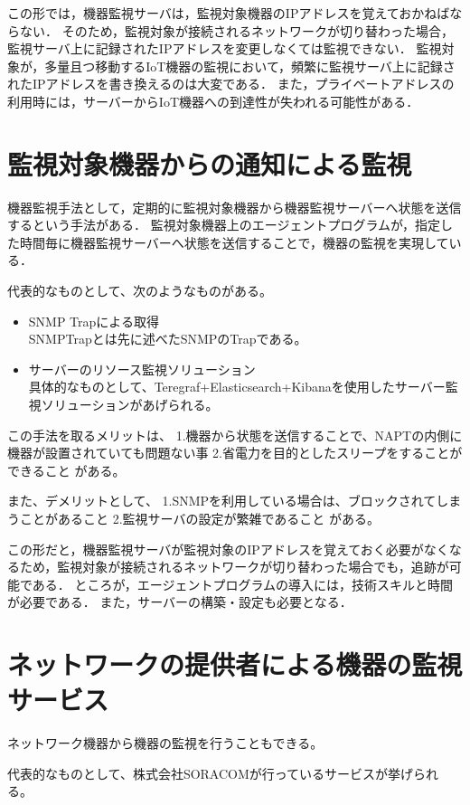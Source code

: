 	この形では，機器監視サーバは，監視対象機器のIPアドレスを覚えておかねばならない．
	そのため，監視対象が接続されるネットワークが切り替わった場合，監視サーバ上に記録されたIPアドレスを変更しなくては監視できない．
	監視対象が，多量且つ移動するIoT機器の監視において，頻繁に監視サーバ上に記録されたIPアドレスを書き換えるのは大変である．
	また，プライベートアドレスの利用時には，サーバーからIoT機器への到達性が失われる可能性がある．

\section{監視対象機器からの通知による監視}
	機器監視手法として，定期的に監視対象機器から機器監視サーバーへ状態を送信するという手法がある．
	監視対象機器上のエージェントプログラムが，指定した時間毎に機器監視サーバーへ状態を送信することで，機器の監視を実現している．
	\medskip
	
	代表的なものとして、次のようなものがある。
	\begin{itemize}
		\item SNMP Trapによる取得\\
			SNMPTrapとは先に述べたSNMPのTrapである。
		\item サーバーのリソース監視ソリューション\\
			具体的なものとして、Teregraf+Elasticsearch+Kibanaを使用したサーバー監視ソリューションがあげられる。
	\end{itemize}
	
	この手法を取るメリットは、
	1.機器から状態を送信することで、NAPTの内側に機器が設置されていても問題ない事
	2.省電力を目的としたスリープをすることができること
	がある。

	また、デメリットとして、
	1.SNMPを利用している場合は、ブロックされてしまうことがあること
	2.監視サーバの設定が繁雑であること
	がある。

	この形だと，機器監視サーバが監視対象のIPアドレスを覚えておく必要がなくなるため，監視対象が接続されるネットワークが切り替わった場合でも，追跡が可能である．
	ところが，エージェントプログラムの導入には，技術スキルと時間が必要である．
	また，サーバーの構築・設定も必要となる．

\section{ネットワークの提供者による機器の監視サービス} %
	ネットワーク機器から機器の監視を行うこともできる。

	代表的なものとして、株式会社SORACOMが行っているサービスが挙げられる。

